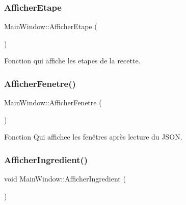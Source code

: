 \subsubsection{\texorpdfstring{Afficher\+Etape}{AfficherEtape}}
{\footnotesize\ttfamily Main\+Window\+::\+Afficher\+Etape (\begin{DoxyParamCaption}{ }\end{DoxyParamCaption})\hspace{0.3cm}{\ttfamily [slot]}}



Fonction qui affiche les etapes de la recette. 

\mbox{\label{class_main_window_a7f4b9726171670ec8d85bb6b09e0665d}} 
\subsubsection{\texorpdfstring{Afficher\+Fenetre()}{AfficherFenetre()}}
{\footnotesize\ttfamily Main\+Window\+::\+Afficher\+Fenetre (\begin{DoxyParamCaption}{ }\end{DoxyParamCaption})}



Fonction Qui affichee les fenêtres après lecture du J\+S\+ON. 

\mbox{\label{class_main_window_ad4059abf16eb904f988371b3791002bf}} 
\subsubsection{\texorpdfstring{Afficher\+Ingredient()}{AfficherIngredient()}}
{\footnotesize\ttfamily void Main\+Window\+::\+Afficher\+Ingredient (\begin{DoxyParamCaption}{ }\end{DoxyParamCaption})}

\mbox{\label{class_main_window_a9bf06dfcc398454facb39e71ebf32550}} 
